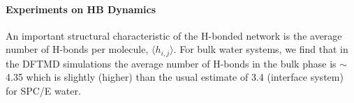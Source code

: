 {\paragraph{Experiments on HB Dynamics}
An important  structural characteristic of the H-bonded network is the average number of H-bonds per molecule, $\langle h_{i,j}\rangle$. \cite{Chowdhary2008} 
For bulk water systems, we find that in the DFTMD simulations the average number of H-bonds in the bulk phase is $\sim$ 4.35 which is slightly
(higher) than the usual estimate of 3.4 (interface system) for SPC/E water.


}

